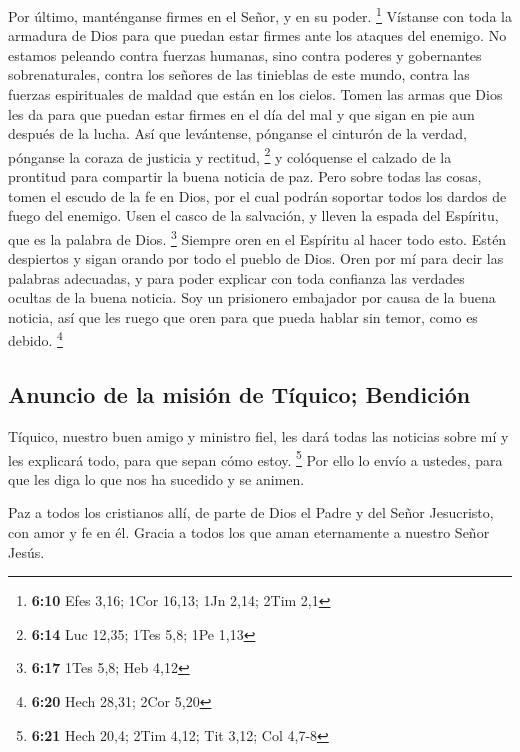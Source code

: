  Por último, manténganse firmes en el Señor, y en su
poder. \footnote{\textbf{6:10} Efes 3,16; 1Cor 16,13; 1Jn 2,14; 2Tim 2,1}
 Vístanse con toda la armadura de Dios para que puedan
estar firmes ante los ataques del enemigo.  No estamos
peleando contra fuerzas humanas, sino contra poderes y gobernantes
sobrenaturales, contra los señores de las tinieblas de este mundo,
contra las fuerzas espirituales de maldad que están en los cielos.
 Tomen las armas que Dios les da para que puedan estar
firmes en el día del mal y que sigan en pie aun después de la lucha.
 Así que levántense, pónganse el cinturón de la verdad,
pónganse la coraza de justicia y rectitud, \footnote{\textbf{6:14} Luc
  12,35; 1Tes 5,8; 1Pe 1,13}  y colóquense el calzado de
la prontitud para compartir la buena noticia de paz. 
Pero sobre todas las cosas, tomen el escudo de la fe en Dios, por el
cual podrán soportar todos los dardos de fuego del enemigo.
 Usen el casco de la salvación, y lleven la espada del
Espíritu, que es la palabra de Dios. \footnote{\textbf{6:17} 1Tes 5,8;
  Heb 4,12}  Siempre oren en el Espíritu al hacer todo
esto. Estén despiertos y sigan orando por todo el pueblo de Dios.
 Oren por mí para decir las palabras adecuadas, y para
poder explicar con toda confianza las verdades ocultas de la buena
noticia.  Soy un prisionero embajador por causa de la
buena noticia, así que les ruego que oren para que pueda hablar sin
temor, como es debido. \footnote{\textbf{6:20} Hech 28,31; 2Cor 5,20}

\hypertarget{anuncio-de-la-misiuxf3n-de-tuxedquico-bendiciuxf3n}{%
\subsection{Anuncio de la misión de Tíquico;
Bendición}\label{anuncio-de-la-misiuxf3n-de-tuxedquico-bendiciuxf3n}}

 Tíquico, nuestro buen amigo y ministro fiel, les dará
todas las noticias sobre mí y les explicará todo, para que sepan cómo
estoy. \footnote{\textbf{6:21} Hech 20,4; 2Tim 4,12; Tit 3,12; Col 4,7-8}
 Por ello lo envío a ustedes, para que les diga lo que
nos ha sucedido y se animen.

 Paz a todos los cristianos allí, de parte de Dios el
Padre y del Señor Jesucristo, con amor y fe en él. 
Gracia a todos los que aman eternamente a nuestro Señor Jesús.
